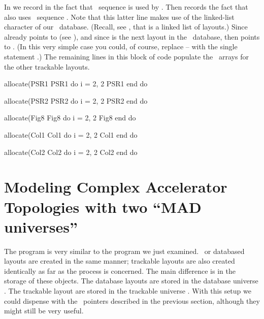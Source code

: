 In  we record in  the fact that \DNA\ sequence  is used by . Then  records the fact that  also uses \DNA\ sequence . Note that this latter line makes use of the linked-list character of our \DNA\ database. (Recall, see , that  is a linked list of layouts.) Since  already points to  (see ), and since  is the next layout in the \DNA\ database, then  points to . (In this very simple case you could, of course, replace -- with the single statement .) The remaining lines in this block of code populate the \DNA\ arrays for the other trackable layouts.
%
\begin{ptccode}
allocate(PSR1%
PSR1%
do i = 2, 2                                   \label{lin:dna.bdo}
  PSR1%
end do                                        \label{lin:dna.edo}

allocate(PSR2%
PSR2%
do i = 2, 2
  PSR2%
end do

allocate(Fig8%
Fig8%
do i = 2, 2
  Fig8%
end do

allocate(Col1%
Col1%
do i = 2, 2
  Col1%
end do

allocate(Col2%
Col2%
do i = 2, 2
  Col2%
end do
\end{ptccode}

\section{Modeling Complex Accelerator Topologies with two ``MAD universes''}
\label{sec:model.topo2s}

The program  is very similar to the program
we just examined. \DNA\ or databased layouts are created in the same
manner; trackable layouts are also created identically as far as the
process is concerned. The main difference is in the storage of these
objects. The database layouts are stored in the database universe
. The trackable layout are stored in the trackable universe
. With this setup we could dispense with the \DNA\ pointers
described in the previous section, although they might still be very
useful.

